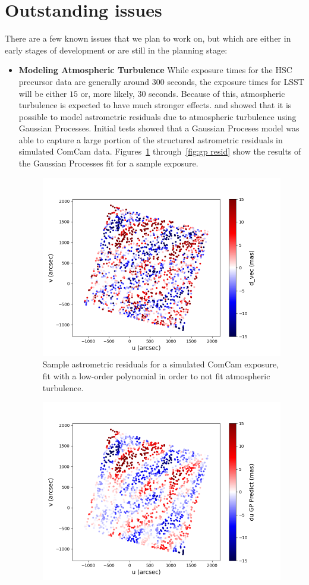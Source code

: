\documentclass[DM,authoryear,toc]{lsstdoc}
\begin{document}
\section{Outstanding issues}\label{sec:out}
There are a few known issues that we plan to work on, but which are either in early stages of development or are still in the planning stage:
\begin{itemize}
\item \textbf{Modeling Atmospheric Turbulence} While exposure times for the HSC precursor data are generally around $300$ seconds, the exposure times for LSST will be either $15$ or, more likely, $30$ seconds. Because of this, atmospheric turbulence is expected to have much stronger effects. \cite{2021AJ....162..106F} and \cite{2021A&A...650A..81L} showed that it is possible to model astrometric residuals due to atmospheric turbulence using Gaussian Processes. Initial tests showed that a Gaussian Proceses model was able to capture a large portion of the structured astrometric residuals in simulated ComCam data. Figures~\ref{fig:gp vec} through~\ref{fig:gp resid} show the results of the Gaussian Processes fit for a sample exposure.
\begin{figure}
\includegraphics[width=0.7\columnwidth]{figures/vec_test_dv.png}
\caption{Sample astrometric residuals for a simulated ComCam exposure, fit with a low-order polynomial in order to not fit atmospheric turbulence.}
\label{fig:gp vec}
\end{figure}
\begin{figure}
\includegraphics[width=0.7\columnwidth]{figures/predict_test_dv.png}

\end{figure}
\end{itemize}
\end{document}
